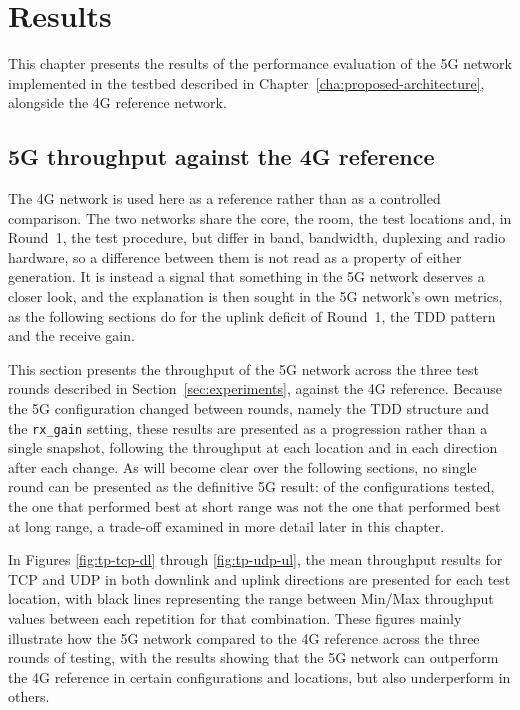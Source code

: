 
%

\chapter{Results}
\label{cha:results}

This chapter presents the results of the performance evaluation of the 5G network implemented in the testbed described in Chapter~\ref{cha:proposed-architecture}, alongside the 4G reference network.

\section{5G throughput against the 4G reference}
\label{sec:4g-vs-5g}

The 4G network is used here as a reference rather than as a controlled comparison. The two networks share the core, the room, the test locations and, in Round~1, the test procedure, but differ in band, bandwidth, duplexing and radio hardware, so a difference between them is not read as a property of either generation. It is instead a signal that something in the 5G network deserves a closer look, and the explanation is then sought in the 5G network's own metrics, as the following sections do for the uplink deficit of Round~1, the \gls{TDD} pattern and the receive gain.

This section presents the throughput of the 5G network across the three test rounds described in Section~\ref{sec:experiments}, against the 4G reference. Because the 5G configuration changed between rounds, namely the \gls{TDD} structure and the \texttt{rx\_gain} setting, these results are presented as a progression rather than a single snapshot, following the throughput at each location and in each direction after each change. As will become clear over the following sections, no single round can be presented as the definitive 5G result: of the configurations tested, the one that performed best at short range was not the one that performed best at long range, a trade-off examined in more detail later in this chapter.

In Figures \ref{fig:tp-tcp-dl} through \ref{fig:tp-udp-ul}, the mean throughput results for TCP and UDP in both downlink and uplink directions are presented for each test location, with black lines representing the range between Min/Max throughput values between each repetition for that combination. These figures mainly illustrate how the 5G network compared to the 4G reference across the three rounds of testing, with the results showing that the 5G network can outperform the 4G reference in certain configurations and locations, but also underperform in others.

